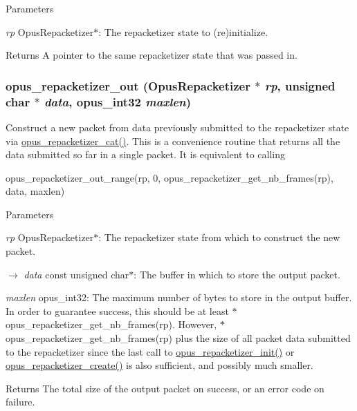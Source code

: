 \begin{DoxyParams}{Parameters}
\item[{\em rp}]{\ttfamily OpusRepacketizer$\ast$}: The repacketizer state to (re)initialize. \end{DoxyParams}
\begin{DoxyReturn}{Returns}
A pointer to the same repacketizer state that was passed in. 
\end{DoxyReturn}
\hypertarget{group__opus__repacketizer_ga19ff1e91a8fa652380f972a224a26481}{
\subsubsection[{opus\_\-repacketizer\_\-out}]{ opus\_\-repacketizer\_\-out ({\bf OpusRepacketizer} $\ast$ {\em rp}, \/  unsigned char $\ast$ {\em data}, \/  {\bf opus\_\-int32} {\em maxlen})}}
\label{group__opus__repacketizer_ga19ff1e91a8fa652380f972a224a26481}


Construct a new packet from data previously submitted to the repacketizer state via \hyperlink{group__opus__repacketizer_ga2840dd56bfa37f8c6874355b9ce8fb46}{opus\_\-repacketizer\_\-cat()}. This is a convenience routine that returns all the data submitted so far in a single packet. It is equivalent to calling 
\begin{DoxyCode}
 opus_repacketizer_out_range(rp, 0, opus_repacketizer_get_nb_frames(rp),
                             data, maxlen)
\end{DoxyCode}
 
\begin{DoxyParams}{Parameters}
\item[{\em rp}]{\ttfamily OpusRepacketizer$\ast$}: The repacketizer state from which to construct the new packet. \item[\mbox{$\rightarrow$} {\em data}]{\ttfamily const unsigned char$\ast$}: The buffer in which to store the output packet. \item[{\em maxlen}]{\ttfamily opus\_\-int32}: The maximum number of bytes to store in the output buffer. In order to guarantee success, this should be at least {$\ast$opus\_\-repacketizer\_\-get\_\-nb\_\-frames(rp)}. However, {$\ast$opus\_\-repacketizer\_\-get\_\-nb\_\-frames(rp)} plus the size of all packet data submitted to the repacketizer since the last call to \hyperlink{group__opus__repacketizer_gab42ff7c3f8a49ff5029fcf60f3b853f0}{opus\_\-repacketizer\_\-init()} or \hyperlink{group__opus__repacketizer_ga6f8813666ef851550ecf8658a731ff7d}{opus\_\-repacketizer\_\-create()} is also sufficient, and possibly much smaller. \end{DoxyParams}
\begin{DoxyReturn}{Returns}
The total size of the output packet on success, or an error code on failure. 
\end{DoxyReturn}

